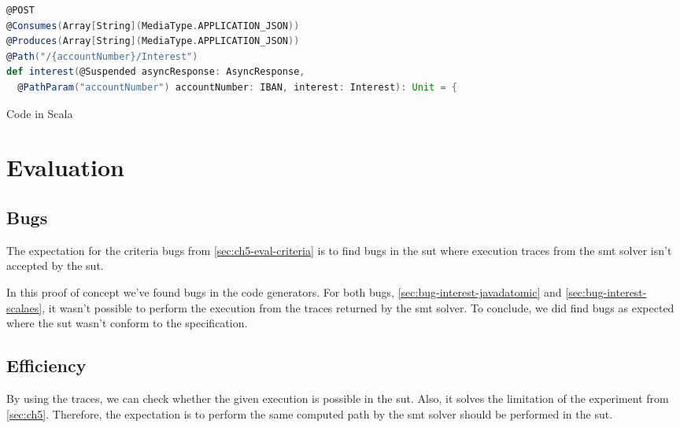 \begin{sourcecode}[h!]
\begin{lstlisting}[language=scala]
@POST
@Consumes(Array[String](MediaType.APPLICATION_JSON))
@Produces(Array[String](MediaType.APPLICATION_JSON))
@Path("/{accountNumber}/Interest")
def interest(@Suspended asyncResponse: AsyncResponse,
  @PathParam("accountNumber") accountNumber: IBAN, interest: Interest): Unit = {
\end{lstlisting}
\caption{Code in Scala}\label{fig:scala-gen-interest-request}
\end{sourcecode}
\FloatBarrier


\section{Evaluation}\label{sec:ch5-evaluation}

\subsection{Bugs}
The expectation for the criteria bugs from \autoref{sec:ch5-eval-criteria} is to
find bugs in the \gls{sut} where execution traces from the \gls{smt} solver isn't accepted
by the \gls{sut}.

In this proof of concept we've found bugs in the code generators. For both bugs,
\autoref{sec:bug-interest-javadatomic} and \autoref{sec:bug-interest-scalaes},
it wasn't possible to perform the execution from the traces returned by the
\gls{smt} solver. To conclude, we did find bugs as expected where the \gls{sut} wasn't
conform to the specification.


\subsection{Efficiency}

By using the traces, we can check whether the given execution is possible in the
\gls{sut}. Also, it solves the limitation of the experiment from
\autoref{sec:ch5}. Therefore, the expectation is to perform the same computed
path by the \gls{smt} solver should be performed in the \gls{sut}.

